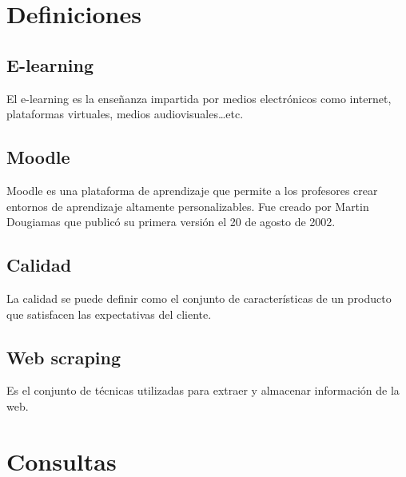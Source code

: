

\section{Definiciones}

\subsection{E-learning}

El e-learning es la enseñanza impartida por medios electrónicos como internet, plataformas virtuales, medios audiovisuales…etc.

\subsection{Moodle}

Moodle es una plataforma de aprendizaje que permite a los profesores crear entornos de aprendizaje altamente personalizables. Fue creado por Martin Dougiamas que publicó su primera versión el 20 de agosto de 2002.

\subsection{Calidad}

La calidad se puede definir como el conjunto de características de un producto que satisfacen las expectativas del cliente.

\subsection{Web scraping}

Es el conjunto de técnicas utilizadas para extraer y almacenar información  de la web.

\section{Consultas}
